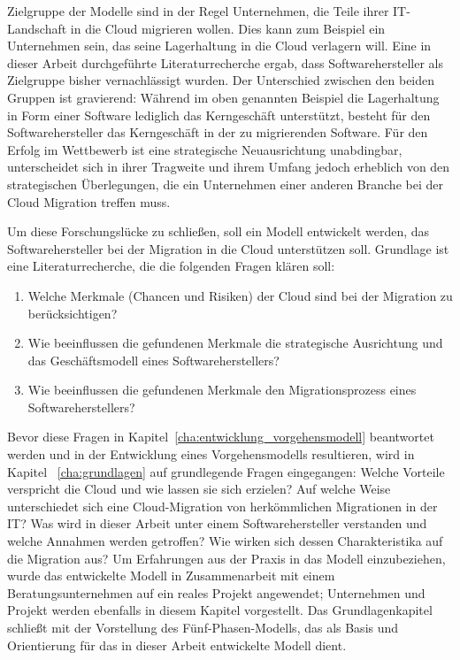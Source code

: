 Zielgruppe der Modelle sind in der Regel Unternehmen, die Teile ihrer 
IT-Landschaft in die Cloud migrieren wollen. Dies kann zum Beispiel ein 
Unternehmen sein, das 
seine Lagerhaltung in die Cloud verlagern will. Eine in 
dieser Arbeit durchgeführte Literaturrecherche ergab, 
dass Softwarehersteller als Zielgruppe bisher vernachlässigt wurden. Der 
Unterschied zwischen den beiden Gruppen ist gravierend: Während im oben 
genannten Beispiel die 
Lagerhaltung in Form einer Software lediglich das Kerngeschäft unterstützt, 
besteht für den Softwarehersteller das Kerngeschäft in der zu migrierenden 
Software. Für den Erfolg im Wettbewerb ist eine strategische 
Neuausrichtung 
unabdingbar, unterscheidet sich in ihrer Tragweite und ihrem Umfang jedoch 
erheblich von den strategischen Überlegungen, die ein Unternehmen einer anderen 
Branche bei der Cloud Migration treffen muss. 

Um diese Forschungslücke zu schließen, soll ein Modell entwickelt werden, das 
Softwarehersteller bei der Migration in die Cloud unterstützen soll. Grundlage 
ist eine Literaturrecherche, die die folgenden Fragen klären soll:
\begin{enumerate}
	\item Welche Merkmale (Chancen und Risiken) der Cloud sind bei der 
Migration zu berücksichtigen?
	\item Wie beeinflussen die gefundenen Merkmale die strategische 
Ausrichtung und das Geschäftsmodell eines Softwareherstellers?
	\item Wie beeinflussen die gefundenen Merkmale den Migrationsprozess 
eines Softwareherstellers?
\end{enumerate}

Bevor diese Fragen in Kapitel~\ref{cha:entwicklung_vorgehensmodell}  
beantwortet werden und in der Entwicklung eines Vorgehensmodells resultieren, 
wird in Kapitel ~\ref{cha:grundlagen} auf grundlegende Fragen eingegangen: 
Welche Vorteile verspricht die Cloud und wie lassen sie sich erzielen? Auf 
welche Weise unterschiedet sich eine Cloud-Migration von herkömmlichen 
Migrationen in der IT? Was wird in dieser Arbeit unter einem Softwarehersteller 
verstanden und welche Annahmen werden getroffen? Wie wirken sich dessen 
Charakteristika auf die Migration aus?
Um Erfahrungen aus der Praxis in das 
Modell einzubeziehen, wurde das entwickelte Modell in Zusammenarbeit mit einem 
Beratungsunternehmen auf ein reales Projekt angewendet; Unternehmen und Projekt 
werden ebenfalls in diesem Kapitel vorgestellt.
Das Grundlagenkapitel schließt mit der Vorstellung des Fünf-Phasen-Modells, das 
als Basis und Orientierung für das in dieser Arbeit entwickelte Modell dient.

